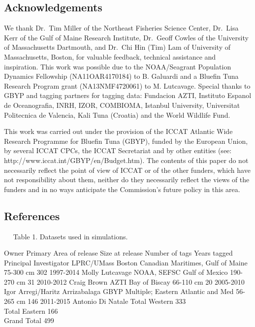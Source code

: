 \documentclass[
  authoryear,
  preprint,
  5p,
  onecolumn]{elsarticle}
\begin{document}
\subsection{Acknowledgements}\label{acknowledgements}

We thank Dr.~Tim Miller of the Northeast Fisheries Science Center,
Dr.~Lisa Kerr of the Gulf of Maine Research Institute, Dr.~Geoff Cowles
of the University of Massachusetts Dartmouth, and Dr.~Chi Hin (Tim) Lam
of University of Massachusetts, Boston, for valuable feedback, technical
assistance and inspiration. This work was possible due to the
NOAA/Seagrant Population Dynamics Fellowship (NA11OAR4170184) to B.
Galuardi and a Bluefin Tuna Research Program grant (NA13NMF4720061) to
M. Lutcavage. Special thanks to GBYP and tagging partners for tagging
data: Fundacion AZTI, Instituto Espanol de Oceanografia, INRH, IZOR,
COMBIOMA, Istanbul University, Universitat Politecnica de Valencia, Kali
Tuna (Croatia) and the World Wildlife Fund.

This work was carried out under the provision of the ICCAT Atlantic Wide
Research Programme for Bluefin Tuna (GBYP), funded by the European
Union, by several ICCAT CPCs, the ICCAT Secretariat and by other
entities (see: http://www.iccat.int/GBYP/en/Budget.htm). The contents of
this paper do not necessarily reflect the point of view of ICCAT or of
the other funders, which have not responsibility about them, neither do
they necessarily reflect the views of the funders and in no ways
anticipate the Commission's future policy in this area.  

\subsection{References}\label{references}

\renewcommand{\bibsection}{}


  Table 1. Datasets used in simulations.

Owner Primary Area of release Size at release Number of tags Years
tagged Principal Investigator LPRC/UMass Boston Canadian Maritimes, Gulf
of Maine 75-300 cm 302 1997-2014 Molly Lutcavage NOAA, SEFSC Gulf of
Mexico 190-270 cm 31 2010-2012 Craig Brown AZTI Bay of Biscay 66-110 cm
20 2005-2010 Igor Arregi/Haritz Arrizabalaga GBYP Multiple; Eastern
Atlantic and Med 56-265 cm 146 2011-2015 Antonio Di Natale Total Western
333\\
Total Eastern 166\\
Grand Total 499
\end{document}
